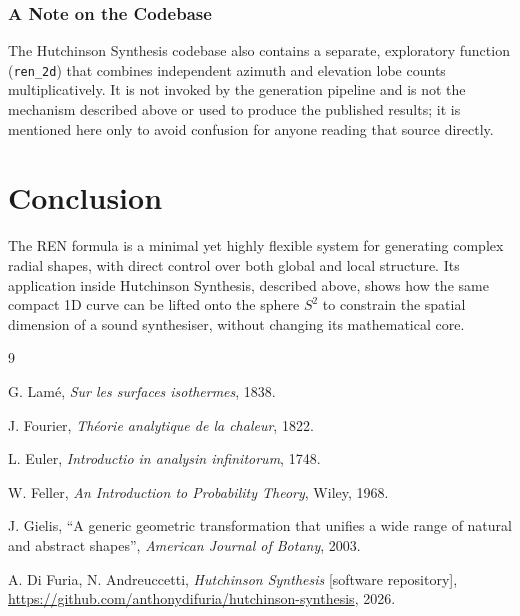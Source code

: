 \documentclass[11pt,a4paper]{article}
\begin{document}
\subsubsection{A Note on the Codebase}

The Hutchinson Synthesis codebase also contains a separate, exploratory
function (\texttt{ren\_2d}) that combines independent azimuth and
elevation lobe counts multiplicatively. It is not invoked by the
generation pipeline and is not the mechanism described above or used to
produce the published results; it is mentioned here only to avoid
confusion for anyone reading that source directly.

\section{Conclusion}

The REN formula is a minimal yet highly flexible system for generating
complex radial shapes, with direct control over both global and local
structure. Its application inside Hutchinson Synthesis, described above,
shows how the same compact 1D curve can be lifted onto the sphere $S^2$ to
constrain the spatial dimension of a sound synthesiser, without changing
its mathematical core.

\newpage

\begin{thebibliography}{9}

G. Lam\'e, \textit{Sur les surfaces isothermes}, 1838.

J. Fourier, \textit{Th\'eorie analytique de la chaleur}, 1822.

L. Euler, \textit{Introductio in analysin infinitorum}, 1748.

W. Feller, \textit{An Introduction to Probability Theory}, Wiley, 1968.

J. Gielis, ``A generic geometric transformation that unifies a wide range of natural and abstract shapes'', \textit{American Journal of Botany}, 2003.

A. Di Furia, N. Andreuccetti, \textit{Hutchinson Synthesis} [software repository], \url{https://github.com/anthonydifuria/hutchinson-synthesis}, 2026.

\end{thebibliography}
\end{document}
